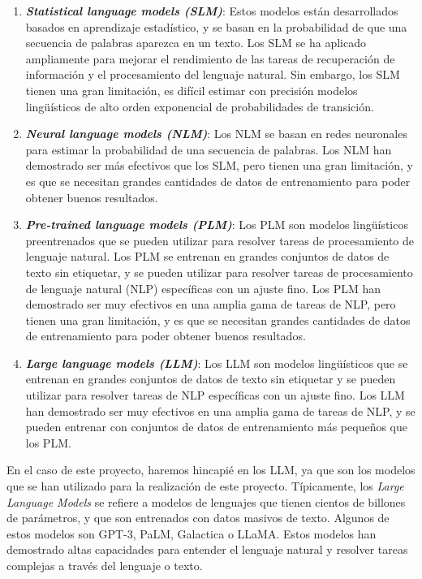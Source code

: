 \begin{enumerate}
    \item \textit{\textbf{Statistical language models (SLM)}}: Estos modelos están desarrollados basados en aprendizaje
        estadístico, y se basan en la probabilidad de que una secuencia de palabras aparezca en un texto. Los
        SLM se ha aplicado ampliamente para mejorar el rendimiento de las tareas de recuperación de información
        y el procesamiento del lenguaje natural. Sin embargo, los SLM tienen una gran limitación, es difícil
        estimar con precisión modelos lingüísticos de alto orden exponencial de probabilidades de transición.
    \item \textit{\textbf{Neural language models (NLM)}}: Los NLM se basan en redes neuronales para estimar la probabilidad
        de una secuencia de palabras. Los NLM han demostrado ser más efectivos que los SLM, pero tienen una gran
        limitación, y es que se necesitan grandes cantidades de datos de entrenamiento para poder obtener buenos
        resultados.
    \item \textit{\textbf{Pre-trained language models (PLM)}}: Los PLM son modelos lingüísticos preentrenados que se pueden
        utilizar para resolver tareas de procesamiento de lenguaje natural. Los PLM se entrenan en grandes conjuntos
        de datos de texto sin etiquetar, y se pueden utilizar para resolver tareas de procesamiento de lenguaje
        natural (NLP) específicas con un ajuste fino. Los PLM han demostrado ser muy efectivos en una amplia gama
        de tareas de NLP, pero tienen una gran limitación, y es que se necesitan grandes cantidades de datos de
        entrenamiento para poder obtener buenos resultados.
    \item \textit{\textbf{Large language models (LLM)}}: Los LLM son modelos lingüísticos que se entrenan en grandes conjuntos
        de datos de texto sin etiquetar y se pueden utilizar para resolver tareas de NLP específicas con un ajuste
        fino. Los LLM han demostrado ser muy efectivos en una amplia gama de tareas de NLP, y se pueden entrenar
        con conjuntos de datos de entrenamiento más pequeños que los PLM.
\end{enumerate}

En el caso de este proyecto, haremos hincapié en los LLM, ya que son los modelos que
se han utilizado para la realización de este proyecto. Típicamente, los \textit{Large
Language Models} se refiere a modelos de lenguajes que tienen cientos de billones de
parámetros, y que son entrenados con datos masivos de texto. Algunos de estos modelos
son GPT-3, PaLM, Galactica o LLaMA. Estos modelos han demostrado altas capacidades para
entender el lenguaje natural y resolver tareas complejas a través del lenguaje o texto.

